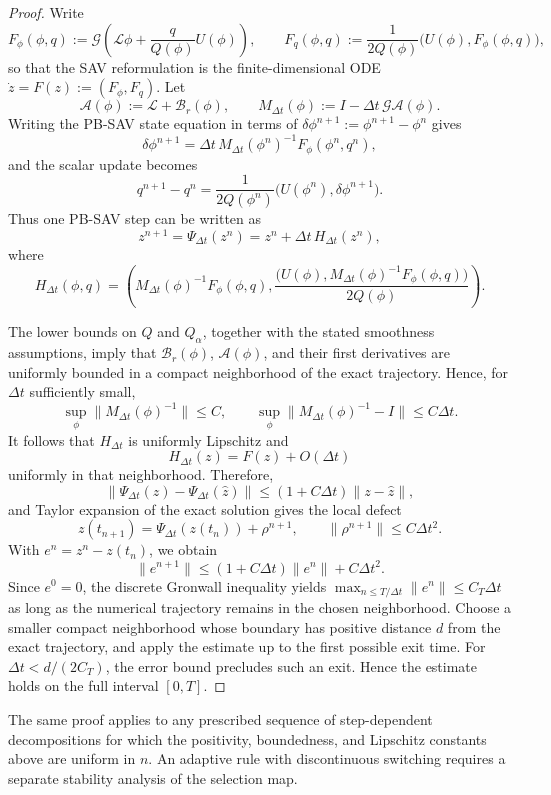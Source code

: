 \documentclass[10pt,onefignum,onetabnum,hidelinks]{siamart251216}
\begin{document}
\begin{proof}
Write
\[
F_\phi(\phi,q)
:=
\mathcal G\left(\mathcal L\phi+\frac{q}{Q(\phi)}U(\phi)\right),
\qquad
F_q(\phi,q)
:=
\frac{1}{2Q(\phi)}\bigl(U(\phi),F_\phi(\phi,q)\bigr),
\]
so that the SAV reformulation is the finite-dimensional ODE
\(\dot z=F(z):=(F_\phi,F_q)\). Let
\[
\mathcal A(\phi):=\mathcal L+\mathcal B_r(\phi),
\qquad
M_{\Delta t}(\phi):=I-\Delta t\,\mathcal G\mathcal A(\phi).
\]
Writing the PB-SAV state equation in terms of
\(\delta\phi^{n+1}:=\phi^{n+1}-\phi^n\) gives
\[
\delta\phi^{n+1}
=
\Delta t\,M_{\Delta t}(\phi^n)^{-1}F_\phi(\phi^n,q^n),
\]
and the scalar update becomes
\[
q^{n+1}-q^n
=
\frac{1}{2Q(\phi^n)}
\bigl(U(\phi^n),\delta\phi^{n+1}\bigr).
\]
Thus one PB-SAV step can be written as
\[
z^{n+1}=\Psi_{\Delta t}(z^n)
=z^n+\Delta t\,H_{\Delta t}(z^n),
\]
where
\[
H_{\Delta t}(\phi,q)
=
\left(
M_{\Delta t}(\phi)^{-1}F_\phi(\phi,q),
\frac{\bigl(U(\phi),M_{\Delta t}(\phi)^{-1}F_\phi(\phi,q)\bigr)}
{2Q(\phi)}
\right).
\]

The lower bounds on \(Q\) and \(Q_\alpha\), together with the stated
smoothness assumptions, imply that \(\mathcal B_r(\phi)\),
\(\mathcal A(\phi)\), and their first derivatives are uniformly bounded in
a compact neighborhood of the exact trajectory. Hence, for
\(\Delta t\) sufficiently small,
\[
\sup_\phi\|M_{\Delta t}(\phi)^{-1}\|\le C,
\qquad
\sup_\phi\|M_{\Delta t}(\phi)^{-1}-I\|\le C\Delta t.
\]
It follows that \(H_{\Delta t}\) is uniformly Lipschitz and
\[
H_{\Delta t}(z)=F(z)+O(\Delta t)
\]
uniformly in that neighborhood. Therefore,
\[
\|\Psi_{\Delta t}(z)-\Psi_{\Delta t}(\widehat z)\|
\le (1+C\Delta t)\|z-\widehat z\|,
\]
and Taylor expansion of the exact solution gives the local defect
\[
z(t_{n+1})
=
\Psi_{\Delta t}(z(t_n))+\rho^{n+1},
\qquad
\|\rho^{n+1}\|\le C\Delta t^2.
\]
With \(e^n=z^n-z(t_n)\), we obtain
\[
\|e^{n+1}\|
\le (1+C\Delta t)\|e^n\|+C\Delta t^2.
\]
Since \(e^0=0\), the discrete Gronwall inequality yields
\(\max_{n\le T/\Delta t}\|e^n\|\le C_T\Delta t\) as long as the numerical
trajectory remains in the chosen neighborhood. Choose a smaller compact
neighborhood whose boundary has positive distance \(d\) from the exact
trajectory, and apply the estimate up to the first possible exit time.
For \(\Delta t<d/(2C_T)\), the error bound precludes such an exit. Hence
the estimate holds on the full interval \([0,T]\).
\end{proof}

\begin{remark}
The same proof applies to any prescribed sequence of step-dependent
decompositions for which the positivity, boundedness, and Lipschitz
constants above are uniform in \(n\). An adaptive rule with discontinuous
switching requires a separate stability analysis of the selection map.
\end{remark}
\end{document}
